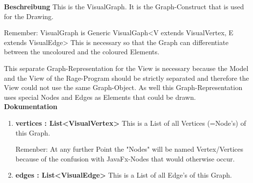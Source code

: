 				\textbf{Beschreibung}\newline
				This is the VisualGraph.
				It is the Graph-Construct that is used for the Drawing.
				
				Remember:
				VisualGraph is Generic
				VisualGaph<V extends VisualVertex, E extends VisualEdge>
				This is necessary so that the Graph can differentiate between the uncoloured and the coloured Elements.
				
				This separate Graph-Representation for the View is necessary because the Model and the View of the Rage-Program should be strictly separated and therefore the View could not use the same Graph-Object.
				As well this Graph-Representation uses special Nodes and Edges as Elements that could be drawn.
				\textbf{Dokumentation}\newline
				\begin{enumerate}[-]
					\item{
						\textbf{vertices : List<VisualVertex>} \newline
						This is a List of all Vertices (=Node's) of this Graph.
						
						Remenber:
						At any further Point the "Nodes" will be named Vertex/Vertices because of the confusion with JavaFx-Nodes that would otherwise occur.
					}
					\item{
						\textbf{edges : List<VisualEdge>}
						This is a List of all Edge's of this Graph.
					}
				\end{enumerate}
